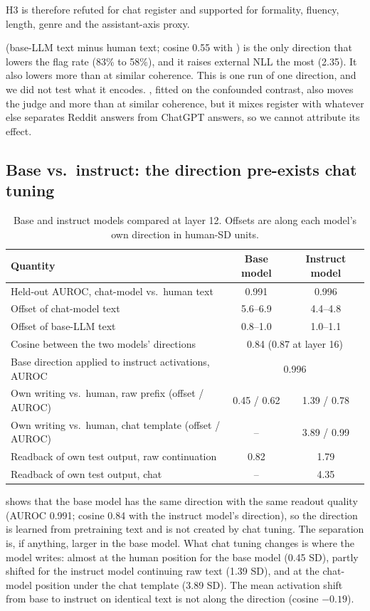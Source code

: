 H3 is therefore refuted for chat register and supported for formality, fluency, length, genre and the assistant-axis proxy.

\aibase (base-LLM text minus human text; cosine 0.55 with \airead) is the only direction that lowers the \bino flag rate (83\% to 58\%), and it raises external NLL the most (2.35).
It also lowers \desklib more than \airead at similar coherence.
This is one run of one direction, and we did not test what it encodes.
\aihc, fitted on the confounded \hcthree contrast, also moves the judge and \desklib more than \airead at similar coherence, but it mixes register with whatever else separates Reddit answers from ChatGPT answers, so we cannot attribute its effect.

\subsection{Base vs.\ instruct: the direction pre-exists chat tuning}
\label{sec:base}

\begin{table}[t]
\centering
\caption{Base and instruct models compared at layer 12. Offsets are along each model's own direction in human-SD units.}
\label{tab:baseinstruct}
\begin{tabular}{@{}lcc@{}}
\toprule
Quantity & Base model & Instruct model \\
\midrule
Held-out AUROC, chat-model vs.\ human text & 0.991 & 0.996 \\
Offset of chat-model text & 5.6--6.9 & 4.4--4.8 \\
Offset of base-LLM text & 0.8--1.0 & 1.0--1.1 \\
Cosine between the two models' directions & \multicolumn{2}{c}{0.84 (0.87 at layer 16)} \\
Base direction applied to instruct activations, AUROC & \multicolumn{2}{c}{0.996} \\
Own writing vs.\ human, raw prefix (offset / AUROC) & 0.45 / 0.62 & 1.39 / 0.78 \\
Own writing vs.\ human, chat template (offset / AUROC) & -- & 3.89 / 0.99 \\
Readback of own test output, raw continuation & 0.82 & 1.79 \\
Readback of own test output, chat & -- & 4.35 \\
\bottomrule
\end{tabular}
\end{table}

 shows that the base model has the same direction with the same readout quality (AUROC 0.991; cosine 0.84 with the instruct model's direction), so the direction is learned from pretraining text and is not created by chat tuning.
The separation is, if anything, larger in the base model.
What chat tuning changes is where the model writes: almost at the human position for the base model (0.45 SD), partly shifted for the instruct model continuing raw text (1.39 SD), and at the chat-model position under the chat template (3.89 SD).
The mean activation shift from base to instruct on identical text is not along the direction (cosine $-0.19$).

